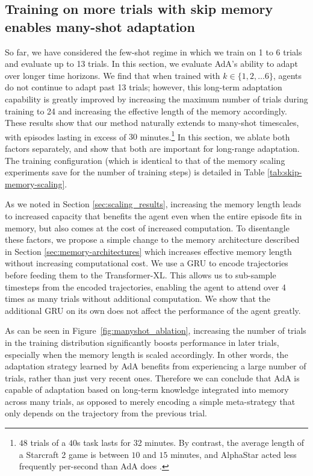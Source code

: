 
\subsection{Training on more trials with skip memory enables many-shot adaptation} \label{sec:results_few_to_many_shot}

So far, we have considered the few-shot regime in which we train on 1 to 6 trials and evaluate up to 13 trials. In this section, we evaluate AdA's ability to adapt over longer time horizons. We find that when trained with $k \in \{1, 2, \dots 6\}$, agents do not continue to adapt past 13 trials; however, this long-term adaptation capability is greatly improved by increasing the maximum number of trials during training to 24 and increasing the effective length of the memory accordingly. These results show that our method naturally extends to many-shot timescales, with episodes lasting in excess of $30$ minutes.\footnote{$48$ trials of a $40$s task lasts for 32 minutes. By contrast, the average length of a Starcraft 2 game is between $10$ and $15$ minutes, and AlphaStar acted less frequently per-second than AdA does \citep{alphastar}.} In this section, we ablate both factors separately, and show that both are important for long-range adaptation. The training configuration (which is identical to that of the memory scaling experiments save for the number of training steps) is detailed in Table \ref{tab:skip-memory-scaling}.

As we noted in Section \ref{sec:scaling_results}, increasing the memory length leads to increased capacity that benefits the agent even when the entire episode fits in memory, but also comes at the cost of increased computation. To disentangle these factors, we propose a simple change to the memory architecture described in Section \ref{sec:memory-architectures} which increases effective memory length without increasing computational cost. We use a GRU to encode trajectories before feeding them to the Transformer-XL. This allows us to sub-sample timesteps from the encoded trajectories, enabling the agent to attend over 4 times as many trials without additional computation. We show that the additional GRU on its own does not affect the performance of the agent greatly.

As can be seen in Figure~\ref{fig:manyshot_ablation}, increasing the number of trials in the training distribution significantly boosts performance in later trials, especially when the memory length is scaled accordingly. In other words, the adaptation strategy learned by AdA benefits from experiencing a large number of trials, rather than just very recent ones. Therefore we can conclude that AdA is capable of adaptation based on long-term knowledge integrated into memory across many trials, as opposed to merely encoding a simple meta-strategy that only depends on the trajectory from the previous trial.  

